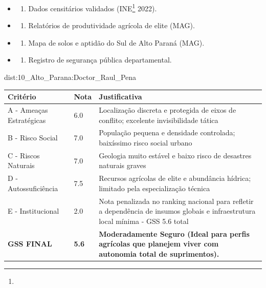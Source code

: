 {\begin{itemize}
\tightlist
\item
  \begin{enumerate}
  \def\labelenumi{\arabic{enumi})}
  \tightlist
  \item
    Dados censitários validados (INE\footnote{\fineINE} 2022).
  \end{enumerate}
\item
  \begin{enumerate}
  \def\labelenumi{\arabic{enumi})}
  \setcounter{enumi}{1}
  \tightlist
  \item
    Relatórios de produtividade agrícola de elite (MAG).
  \end{enumerate}
\item
  \begin{enumerate}
  \def\labelenumi{\arabic{enumi})}
  \setcounter{enumi}{2}
  \tightlist
  \item
    Mapa de solos e aptidão do Sul de Alto Paraná (MAG).
  \end{enumerate}
\item
  \begin{enumerate}
  \def\labelenumi{\arabic{enumi})}
  \setcounter{enumi}{3}
  \tightlist
  \item
    Registro de segurança pública departamental.
  \end{enumerate}
\end{itemize}}{dist:10_Alto_Parana:Doctor_Raul_Pena}
\begin{table}[ht!]
\small \begin{tabular}{p{3.0cm}p{0.8cm}p{6.0cm}} \toprule
\textbf{Critério} & \textbf{Nota} & \textbf{Justificativa} \\ \midrule
A - Ameaças Estratégicas & 6.0 & Localização discreta e protegida de eixos de conflito; excelente invisibilidade tática \\
B - Risco Social & 7.0 & População pequena e densidade controlada; baixíssimo risco social urbano \\
C - Riscos Naturais & 7.0 & Geologia muito estável e baixo risco de desastres naturais graves \\
D - Autossuficiência & 7.5 & Recursos agrícolas de elite e abundância hídrica; limitado pela especialização técnica \\
E - Institucional & 2.0 & Nota penalizada no ranking nacional para refletir a dependência de insumos globais e infraestrutura local mínima - GSS 5.6 total \\
\midrule \textbf{GSS FINAL} & \textbf{5.6} & \textbf{Moderadamente Seguro (Ideal para perfis agrícolas que planejem viver com autonomia total de suprimentos).} \\ \bottomrule \end{tabular}
\end{table}
